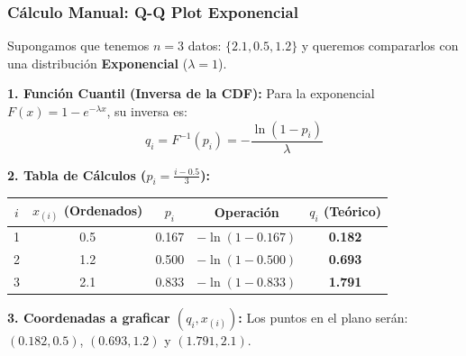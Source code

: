 \documentclass[aspectratio=1610, 10pt]{beamer}
\begin{document}
\begin{frame}
\frametitle{Cálculo Manual: Q-Q Plot Exponencial}
Supongamos que tenemos $n=3$ datos: $\{2.1, 0.5, 1.2\}$ y queremos compararlos con una distribución \textbf{Exponencial} ($\lambda = 1$).

\vspace{0.2cm}
\textbf{1. Función Cuantil (Inversa de la CDF):}
Para la exponencial $F(x) = 1 - e^{-\lambda x}$, su inversa es:
$$q_i = F^{-1}(p_i) = -\frac{\ln(1 - p_i)}{\lambda}$$

\textbf{2. Tabla de Cálculos ($p_i = \frac{i - 0.5}{3}$):}
\begin{center}
\small
\begin{tabular}{ccccc}
\toprule
$i$ & $x_{(i)}$ (Ordenados) & $p_i$ & Operación & $q_i$ (Teórico) \\ \midrule
1 & 0.5 & 0.167 & $-\ln(1-0.167)$ & \textbf{0.182} \\
2 & 1.2 & 0.500 & $-\ln(1-0.500)$ & \textbf{0.693} \\
3 & 2.1 & 0.833 & $-\ln(1-0.833)$ & \textbf{1.791} \\ \bottomrule
\end{tabular}
\end{center}

\vspace{0.2cm}
\textbf{3. Coordenadas a graficar $(q_i, x_{(i)})$:}
Los puntos en el plano serán: $(0.182, 0.5)$, $(0.693, 1.2)$ y $(1.791, 2.1)$.
\end{frame}
\end{document}
